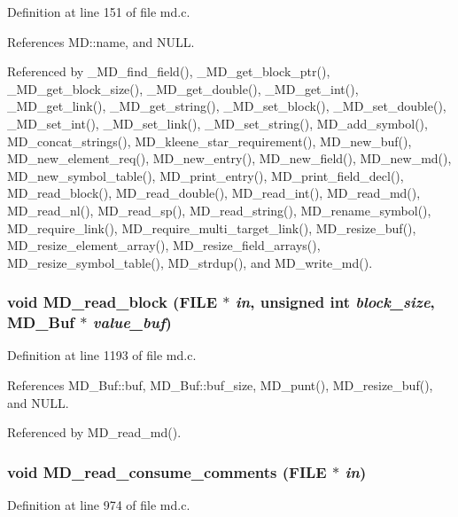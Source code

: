 Definition at line 151 of file md.c.

References MD::name, and NULL.

Referenced by \_\-MD\_\-find\_\-field(), \_\-MD\_\-get\_\-block\_\-ptr(), \_\-MD\_\-get\_\-block\_\-size(), \_\-MD\_\-get\_\-double(), \_\-MD\_\-get\_\-int(), \_\-MD\_\-get\_\-link(), \_\-MD\_\-get\_\-string(), \_\-MD\_\-set\_\-block(), \_\-MD\_\-set\_\-double(), \_\-MD\_\-set\_\-int(), \_\-MD\_\-set\_\-link(), \_\-MD\_\-set\_\-string(), MD\_\-add\_\-symbol(), MD\_\-concat\_\-strings(), MD\_\-kleene\_\-star\_\-requirement(), MD\_\-new\_\-buf(), MD\_\-new\_\-element\_\-req(), MD\_\-new\_\-entry(), MD\_\-new\_\-field(), MD\_\-new\_\-md(), MD\_\-new\_\-symbol\_\-table(), MD\_\-print\_\-entry(), MD\_\-print\_\-field\_\-decl(), MD\_\-read\_\-block(), MD\_\-read\_\-double(), MD\_\-read\_\-int(), MD\_\-read\_\-md(), MD\_\-read\_\-nl(), MD\_\-read\_\-sp(), MD\_\-read\_\-string(), MD\_\-rename\_\-symbol(), MD\_\-require\_\-link(), MD\_\-require\_\-multi\_\-target\_\-link(), MD\_\-resize\_\-buf(), MD\_\-resize\_\-element\_\-array(), MD\_\-resize\_\-field\_\-arrays(), MD\_\-resize\_\-symbol\_\-table(), MD\_\-strdup(), and MD\_\-write\_\-md().
\subsubsection{\setlength{\rightskip}{0pt plus 5cm}void MD\_\-read\_\-block (FILE $\ast$ {\em in}, unsigned int {\em block\_\-size}, \bf{MD\_\-Buf} $\ast$ {\em value\_\-buf})}\label{md_8c_cb48418267fdf29092388df141224590}




Definition at line 1193 of file md.c.

References MD\_\-Buf::buf, MD\_\-Buf::buf\_\-size, MD\_\-punt(), MD\_\-resize\_\-buf(), and NULL.

Referenced by MD\_\-read\_\-md().
\subsubsection{\setlength{\rightskip}{0pt plus 5cm}void MD\_\-read\_\-consume\_\-comments (FILE $\ast$ {\em in})}\label{md_8c_621561ecbf7802a86d2f6afeb103d81c}




Definition at line 974 of file md.c.

